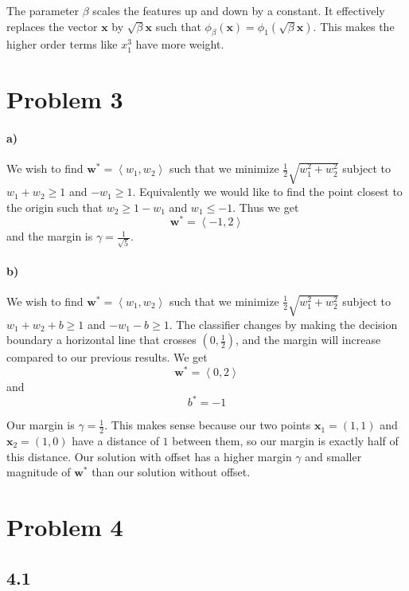 \documentclass[12pt]{article}
\begin{document}
The parameter \(\beta\) scales the features up and down by a constant. It effectively replaces the vector \(\mathbf{x}\) by \(\sqrt{\beta}\mathbf{x}\)
such that \(\phi_\beta(\mathbf{x})=\phi_1(\sqrt{\beta}\mathbf{x})\). This makes the higher order terms like \(x_1^3\) have more weight.

\section*{Problem 3}

\paragraph{a)}

We wish to find \(\mathbf{w}^*=\left<w_1,w_2\right>\) such that we minimize \(\frac{1}{2}\sqrt{w_1^2+w_2^2}\) subject to \(w_1+w_2\geq 1\) and \(-w_1\geq 1\).
Equivalently we would like to find the point closest to the origin such that \(w_2\geq 1-w_1\) and \(w_1\leq -1\). Thus we get
\[\mathbf{w}^*=\left<-1,2\right>\]
and the margin is \(\gamma=\frac{1}{\sqrt{5}}\).

\paragraph{b)}

We wish to find \(\mathbf{w}^*=\left<w_1,w_2\right>\) such that we minimize \(\frac{1}{2}\sqrt{w_1^2+w_2^2}\) subject to \(w_1+w_2+b\geq 1\) and \(-w_1-b\geq 1\).
The classifier changes by making the decision boundary a horizontal line that crosses \(\left(0,\frac{1}{2}\right)\), and the margin will increase compared to our
previous results. We get
\[\mathbf{w}^*=\left<0,2\right>\]
and
\[b^*=-1\]

Our margin is \(\gamma=\frac{1}{2}\). This makes sense because our two points \(\mathbf{x}_1=(1,1)\) and \(\mathbf{x}_2=(1,0)\) have a distance of \(1\) between them,
so our margin is exactly half of this distance. Our solution with offset has a higher margin \(\gamma\) and smaller magnitude of \(\mathbf{w}^*\) than our
solution without offset.

\section*{Problem 4}

\subsection*{4.1}
\end{document}

